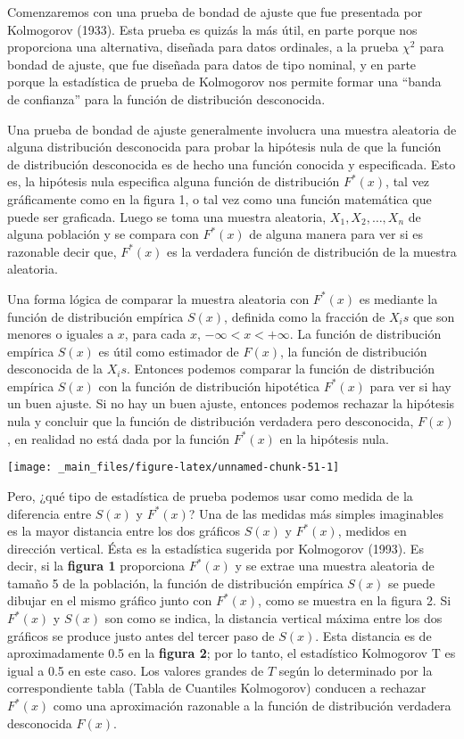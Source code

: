 \documentclass[
  a4paper,
  oneside,
  openany]{book}
\begin{document}
Comenzaremos con una prueba de bondad de ajuste que fue presentada por Kolmogorov (1933). Esta prueba es quizás la más útil, en parte porque nos proporciona una alternativa, diseñada para datos ordinales, a la prueba \(\chi^2\) para bondad de ajuste, que fue diseñada para datos de tipo nominal, y en parte porque la estadística de prueba de Kolmogorov nos permite formar una ``banda de confianza'' para la función de distribución desconocida.

Una prueba de bondad de ajuste generalmente involucra una muestra aleatoria de alguna distribución desconocida para probar la hipótesis nula de que la función de distribución desconocida es de hecho una función conocida y especificada. Esto es, la hipótesis nula especifica alguna función de distribución \(F ^*(x)\), tal vez gráficamente como en la figura 1, o tal vez como una función matemática que puede ser graficada. Luego se toma una muestra aleatoria, \(X_{1},X_{2},\ldots, X_{n}\) de alguna población y se compara con \(F^*(x)\) de alguna manera para ver si es razonable decir que, \(F^*(x)\) es la verdadera función de distribución de la muestra aleatoria.

Una forma lógica de comparar la muestra aleatoria con \(F^*(x)\) es mediante la función de distribución empírica \(S(x)\), definida como la fracción de \(X_{i}s\) que son menores o iguales a \(x\), para cada \(x\), \(-\infty<x< + \infty\).
La función de distribución empírica \(S(x)\) es útil como estimador de \(F(x)\), la función de distribución desconocida de la \(X_{i}s\). Entonces podemos comparar la función de distribución empírica \(S(x)\) con la función de distribución hipotética \(F^*(x)\) para ver si hay un buen ajuste.
Si no hay un buen ajuste, entonces podemos rechazar la hipótesis nula y concluir que la función de distribución verdadera pero desconocida, \(F(x)\), en realidad no está dada por la función \(F^*(x)\) en la hipótesis nula.

\begin{center}\texttt{[image: \_main\_files/figure-latex/unnamed-chunk-51-1]} \end{center}

Pero, ¿qué tipo de estadística de prueba podemos usar como medida de la diferencia entre \(S(x)\) y \(F^* (x)\)? Una de las medidas más simples imaginables es la mayor distancia entre los dos gráficos \(S(x)\) y \(F^*(x)\), medidos en dirección vertical. Ésta es la estadística sugerida por Kolmogorov (1993).
Es decir, si la \textbf{figura 1} proporciona \(F^*(x)\) y se extrae una muestra aleatoria de tamaño 5 de la población, la función de distribución empírica \(S(x)\) se puede dibujar en el mismo gráfico junto con \(F^ *(x)\), como se muestra en la figura 2.
Si \(F^*(x)\) y \(S(x)\) son como se indica, la distancia vertical máxima entre los dos gráficos se produce justo antes del tercer paso de \(S(x)\).
Esta distancia es de aproximadamente 0.5 en la \textbf{figura 2}; por lo tanto, el estadístico Kolmogorov T es igual a 0.5 en este caso.
Los valores grandes de \(T\) según lo determinado por la correspondiente tabla (Tabla de Cuantiles Kolmogorov) conducen a rechazar \(F^*(x)\) como una aproximación razonable a la función de distribución verdadera desconocida \(F(x)\).
\end{document}
